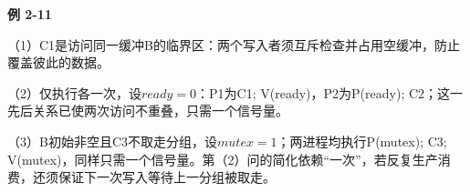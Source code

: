 {\color{ink}\bfseries 例 2-11}\par\vspace{1bp}（1）C1是访问同一缓冲B的临界区：两个写入者须互斥检查并占用空缓冲，防止覆盖彼此的数据。\par （2）仅执行各一次，设\(ready=\allowbreak{}0\)：P1为C1;\allowbreak{} V(ready)，P2为P(ready);\allowbreak{} C2；这一先后关系已使两次访问不重叠，只需一个信号量。\par （3）B初始非空且C3不取走分组，设\(mutex=\allowbreak{}1\)；两进程均执行P(mutex);\allowbreak{} C3;\allowbreak{} V(mutex)，同样只需一个信号量。第（2）问的简化依赖“一次”，若反复生产消费，还须保证下一次写入等待上一分组被取走。
